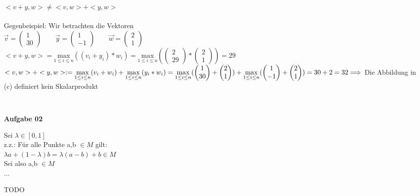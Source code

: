 \documentclass[a4paper,10pt]{article}
\begin{document}
\begin{compactenum} [(a)]
		\item $ <v+y,w> \neq <v,w> + <y,w> $\\\\
		Gegenbeispiel: Wir betrachten die Vektoren\\
		$ \vec{v} = \begin{pmatrix}
		1 \\ 30
		\end{pmatrix} \qquad
		\vec{y} = \begin{pmatrix}
		1 \\ -1
		\end{pmatrix} \qquad
		\vec{w} = \begin{pmatrix}
		2 \\ 1
		\end{pmatrix}$\\
		$ <v+y,w> = \underset{1 \leq i \leq n}{\text{max}} (
			(v_i+y_i) * w_i) = \underset{1 \leq i \leq n}{\text{max}} (\begin{pmatrix} 2 \\ 29 \end{pmatrix} * 
			\begin{pmatrix} 2 \\ 1 \end{pmatrix}) = 29 $ \\
		$ <v,w> + <y,w> := \underset{1 \leq i \leq n}{\text{max}} (v_i + w_i) + \underset{1 \leq i \leq n}{\text{max}} (y_i * w_i) = 
		\underset{1 \leq i \leq n}{\text{max}} (
		\begin{pmatrix}
		1 \\ 30
		\end{pmatrix} + 
		\begin{pmatrix}
		2 \\ 1
		\end{pmatrix}) + \underset{1 \leq i \leq n}{\text{max}} (
		\begin{pmatrix}
		1 \\ -1
		\end{pmatrix} + 
		\begin{pmatrix}
		2 \\ 1
		\end{pmatrix} )\\
		= 30 + 2 = 32 \\
		\Longrightarrow $ Die Abbildung in (c) definiert kein Skalarprodukt
		
	\end{compactenum} \
	
	\textbf{Aufgabe 02}\\
	\begin{compactenum} [(a)]
		\item Sei $ \lambda \in [0,1] $\\
		z.z.: Für alle Punkte a,b $ \in M $ gilt:\\
		$ \lambda a + (1- \lambda) b = \lambda (a-b) + b \in M $\\
		Sei also a,b $ \in M $\\
		...
		\\
		\item TODO
	\end{compactenum}
	
	
\end{document}
